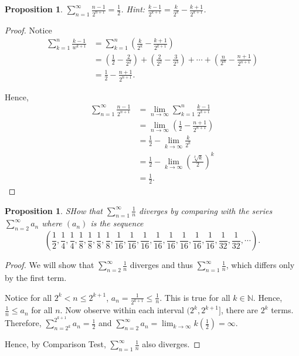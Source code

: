 \documentclass{article}
\newtheorem{proposition}[thm]{Proposition}
\begin{document}
\begin{proposition}
    $\sum_{n=1}^{\infty}\frac{n-1}{2^{n+1}}=\frac{1}{2}$. 
    Hint: $\frac{k-1}{2^{k+1}}=\frac{k}{2^k}-\frac{k+1}{2^{k+1}}$.
\end{proposition}
\begin{proof}
    Notice 
    \begin{align*}
        \sum_{k=1}^{n}\frac{k-1}{w^{k+1}} & = 
        \sum_{k=1}^{n}\left(\frac{k}{2^k}-\frac{k+1}{2^{k+1}}\right) \\
        & = \left(\frac{1}{2}-\frac{2}{2^2}\right) + \left(\frac{2}{2^2}-\frac{3}{2^3}\right) 
        + \cdots + \left(\frac{n}{2^n}-\frac{n+1}{2^{n+1}}\right) \\
        & = \frac{1}{2} - \frac{n+1}{2^{n+1}}.
    \end{align*}

    Hence, 
    \begin{align*}
        \sum_{n=1}^{\infty}\frac{n-1}{2^{n+1}} & = \lim_{n\to\infty}\sum_{k=1}^{n}\frac{k-1}{2^{k+1}} \\
        & = \lim_{n\to\infty}\left(\frac{1}{2} - \frac{n+1}{2^{n+1}}\right) \\
        & = \frac{1}{2} - \lim_{k\to\infty}\frac{k}{2^k} \\
        & = \frac{1}{2} - \lim_{k\to\infty}\left(\frac{\sqrt[k]{k}}{2}\right)^k \\
        & = \frac{1}{2}.
    \end{align*}
\end{proof}

\begin{proposition}
    SHow that $\sum_{n=1}^{\infty}\frac{1}{n}$ diverges by comparing with the series 
    $\sum_{n=2}^{\infty}a_n$ where $(a_n)$ is the sequence 
    $$(\frac{1}{2},\frac{1}{4},\frac{1}{4},\frac{1}{8},\frac{1}{8},\frac{1}{8},\frac{1}{8}
    ,\frac{1}{16},\frac{1}{16},\frac{1}{16},\frac{1}{16},\frac{1}{16},\frac{1}{16},\frac{1}{16}
    ,\frac{1}{16},\frac{1}{32},\frac{1}{32}, \cdots).$$
\end{proposition}
\begin{proof}
    We will show that $\sum_{n=2}^{\infty}\frac{1}{n}$ diverges and thus 
    $\sum_{n=1}^{\infty}\frac{1}{n}$, which differs only by the first term.

    Notice for all $2^k< n\le2^{k+1}$, $a_n = \frac{1}{2^{k+1}}\le\frac{1}{n}$. This is true for 
    all $k\in\mathbb{N}$. Hence, $\frac{1}{n}\le a_n$ for all $n$. Now observe within each interval 
    $(2^k,2^{k+1}]$, there are $2^k$ terms. Therefore, $\sum_{n=2^k}^{2^{k+1}}a_n=\frac{1}{2}$ and 
    $\sum_{n=2}^{\infty}a_n = \lim_{k\to\infty}k\left(\frac{1}{2}\right)=\infty$. 

    Hence, by Comparison Test, $\sum_{n=1}^{\infty}\frac{1}{n}$ also diverges.
\end{proof}
\end{document}
